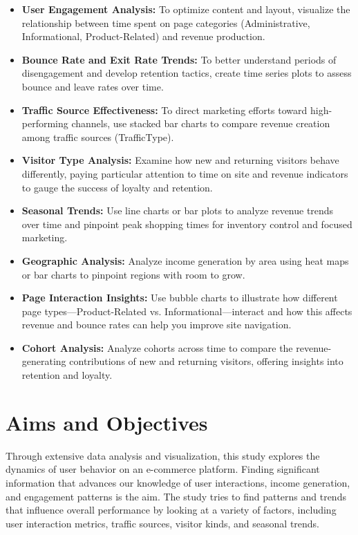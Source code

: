 \documentclass[12pt]{article}
\begin{document}
\begin{itemize}
    \item \textbf{User Engagement Analysis:} To optimize content and layout, visualize the relationship between time spent on page categories (Administrative, Informational, Product-Related) and revenue production.
    \item \textbf{Bounce Rate and Exit Rate Trends:} To better understand periods of disengagement and develop retention tactics, create time series plots to assess bounce and leave rates over time.
    \item \textbf{Traffic Source Effectiveness:} To direct marketing efforts toward high-performing channels, use stacked bar charts to compare revenue creation among traffic sources (TrafficType).
    \item \textbf{Visitor Type Analysis:} Examine how new and returning visitors behave differently, paying particular attention to time on site and revenue indicators to gauge the success of loyalty and retention.
    \item \textbf{Seasonal Trends:} Use line charts or bar plots to analyze revenue trends over time and pinpoint peak shopping times for inventory control and focused marketing.
    \item \textbf{Geographic Analysis:} Analyze income generation by area using heat maps or bar charts to pinpoint regions with room to grow.
    \item \textbf{Page Interaction Insights:} Use bubble charts to illustrate how different page types—Product-Related vs. Informational—interact and how this affects revenue and bounce rates can help you improve site navigation.
    \item \textbf{Cohort Analysis:} Analyze cohorts across time to compare the revenue-generating contributions of new and returning visitors, offering insights into retention and loyalty.
\end{itemize}


\section{Aims and Objectives}
Through extensive data analysis and visualization, this study explores the dynamics of user behavior on an e-commerce platform. Finding significant information that advances our knowledge of user interactions, income generation, and engagement patterns is the aim. The study tries to find patterns and trends that influence overall performance by looking at a variety of factors, including user interaction metrics, traffic sources, visitor kinds, and seasonal trends.
\end{document}
